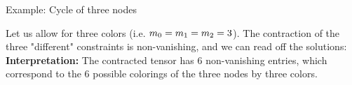 \documentclass{beamer}
\begin{document}
    \begin{frame}{Example: Cycle of three nodes}

        Let us allow for three colors (i.e. $m_{0}=m_{1}=m_{2}=3$).
        The contraction of the three "different" constraints is non-vanishing, and we can read off the solutions:
        {\bf Interpretation:}
        The contracted tensor has $6$ non-vanishing entries, which correspond to the $6$ possible colorings of the three nodes by three colors.
    \end{frame}
\end{document}
